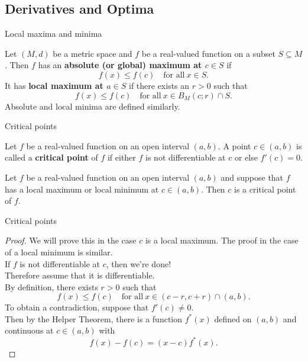 \documentclass{beamer}
\begin{document}
\subsection{Derivatives and Optima}

\begin{frame}{Local maxima and minima}
\begin{defn}
Let $(M,d)$ be a metric space and $f$ be a real-valued function on a subset $S\subseteq M$.
\pause
Then $f$ has an \textbf{absolute (or global) maximum at $c\in S$} if
$$f(x)\leq f(c)\quad\text{for all}\ x\in S.$$
\pause
It has \textbf{local maximum at $a\in S$} if there exists an $r>0$ such that
$$f(x)\leq f(c)\quad\text{for all}\ x\in B_M(c;r)\cap S.$$
\pause
Absolute and local minima are defined similarly.
\end{defn}
\end{frame}

\begin{frame}{Critical points}
\begin{defn}
Let $f$ be a real-valued function on an open interval $(a,b)$.
\pause
A point $c\in (a,b)$ is called a \textbf{critical point} of $f$ if either $f$ is not differentiable at $c$ or else $f'(c) = 0$.
\end{defn}
\pause
\begin{thm}
Let $f$ be a real-valued function on an open interval $(a,b)$ and suppose that $f$ has a local maximum or local minimum at $c\in (a,b)$.
Then $c$ is a critical point of $f$.
\end{thm}
\end{frame}

\begin{frame}{Critical points}
\begin{proof}
\pause
We will prove this in the case $c$ is a local maximum.  The proof in the case of a local minimum is similar.\\
\pause
If $f$ is not differentiable at $c$, then we're done!\\
\pause
Therefore assume that it is differentiable.\\
\pause
By definition, there exists $r>0$ such that
$$f(x)\leq f(c)\quad\text{for all}\ x\in (c-r,c+r)\cap (a,b).$$
\pause
To obtain a contradiction, suppose that $f'(c)\neq 0$.\\
\pause
Then by the Helper Theorem, there is a function $f^*(x)$ defined on $(a,b)$ and continuous at $c\in (a,b)$ with
$$f(x)-f(c) = (x-c)f^*(x).$$
\end{proof}
\end{frame}
\end{document}
